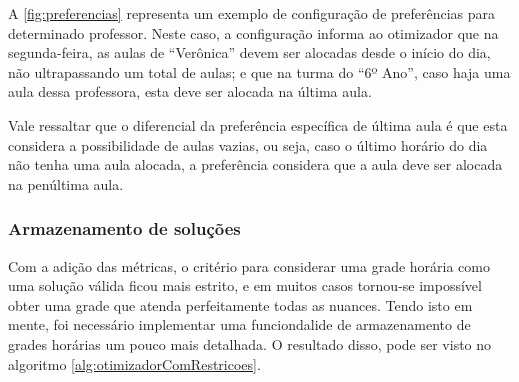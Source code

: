 A \autoref{fig:preferencias} representa um exemplo de configuração de preferências para determinado professor. Neste caso, a configuração informa ao otimizador que na segunda-feira, as aulas de ``Verônica'' devem ser alocadas desde o início do dia, não ultrapassando um total de aulas; e que na turma do ``6º Ano'', caso haja uma aula dessa professora, esta deve ser alocada na última aula.

Vale ressaltar que o diferencial da preferência específica de última aula é que esta considera a possibilidade de aulas vazias, ou seja, caso o último horário do dia não tenha uma aula alocada, a preferência considera que a aula deve ser alocada na penúltima aula.

\subsubsection{Armazenamento de soluções}
\label{subsec:salvamento}

Com a adição das métricas, o critério para considerar uma grade horária como uma solução válida ficou mais estrito, e em muitos casos tornou-se impossível obter uma grade que atenda perfeitamente todas as nuances. Tendo isto em mente, foi necessário implementar uma funciondalide de armazenamento de grades horárias um pouco mais detalhada. O resultado disso, pode ser visto no algoritmo \ref{alg:otimizadorComRestricoes}.


